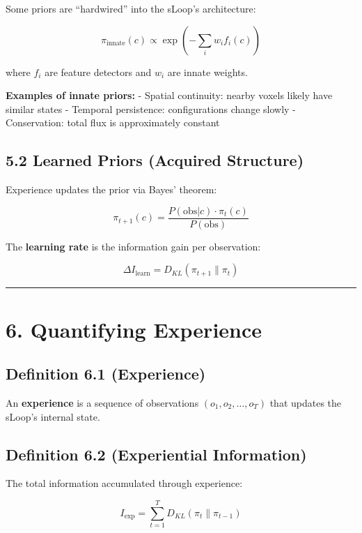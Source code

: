 \documentclass[
  11pt,
  letterpaper,
  twoside,
  openright]{book}
\begin{document}
Some priors are ``hardwired'' into the sLoop's architecture:

\[\pi_{\text{innate}}(c) \propto \exp\left(-\sum_i w_i f_i(c)\right)\]

where \(f_i\) are feature detectors and \(w_i\) are innate weights.

\textbf{Examples of innate priors:} - Spatial continuity: nearby voxels
likely have similar states - Temporal persistence: configurations change
slowly - Conservation: total flux is approximately constant

\subsection{5.2 Learned Priors (Acquired
Structure)}\label{learned-priors-acquired-structure}

Experience updates the prior via Bayes' theorem:

\[\pi_{t+1}(c) = \frac{P(\text{obs}|c) \cdot \pi_t(c)}{P(\text{obs})}\]

The \textbf{learning rate} is the information gain per observation:

\[\Delta I_{\text{learn}} = D_{KL}(\pi_{t+1} \| \pi_t)\]

\begin{center}\rule{0.5\linewidth}{0.5pt}\end{center}

\section{6. Quantifying Experience}\label{quantifying-experience}

\subsection{Definition 6.1
(Experience)}\label{definition-6.1-experience}

An \textbf{experience} is a sequence of observations
\((o_1, o_2, \ldots, o_T)\) that updates the sLoop's internal state.

\subsection{Definition 6.2 (Experiential
Information)}\label{definition-6.2-experiential-information}

The total information accumulated through experience:

\[I_{\text{exp}} = \sum_{t=1}^T D_{KL}(\pi_t \| \pi_{t-1})\]
\end{document}
